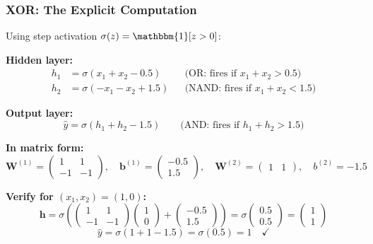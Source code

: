 \documentclass[notes,11pt, aspectratio=169]{beamer}
\newcommand{\vb}{\mathbf{b}}
\newcommand{\vh}{\mathbf{h}}
\newcommand{\vW}{\mathbf{W}}
\begin{document}
\begin{frame}
\frametitle{XOR: The Explicit Computation}

Using step activation $\sigma(z) = \mathbbm{1}[z > 0]$:

\vspace{4pt}
\textbf{Hidden layer:}
\begin{align*}
    h_1 &= \sigma(x_1 + x_2 - 0.5) && \text{(OR: fires if $x_1 + x_2 > 0.5$)} \\
    h_2 &= \sigma(-x_1 - x_2 + 1.5) && \text{(NAND: fires if $x_1 + x_2 < 1.5$)}
\end{align*}

\textbf{Output layer:}
\[
    \hat{y} = \sigma(h_1 + h_2 - 1.5) \qquad \text{(AND: fires if $h_1 + h_2 > 1.5$)}
\]

\vspace{4pt}
\textbf{In matrix form:}
\[
    \vW^{(1)} = \begin{pmatrix} 1 & 1 \\ -1 & -1 \end{pmatrix}, \quad
    \vb^{(1)} = \begin{pmatrix} -0.5 \\ 1.5 \end{pmatrix}, \quad
    \vW^{(2)} = \begin{pmatrix} 1 & 1 \end{pmatrix}, \quad
    b^{(2)} = -1.5
\]

\vspace{4pt}
\textbf{Verify for $(x_1, x_2) = (1, 0)$:}
\[
    \vh = \sigma\!\left(\begin{pmatrix}1 & 1 \\ -1 & -1\end{pmatrix}\begin{pmatrix}1\\0\end{pmatrix} + \begin{pmatrix}-0.5\\1.5\end{pmatrix}\right) = \sigma\!\begin{pmatrix}0.5\\0.5\end{pmatrix} = \begin{pmatrix}1\\1\end{pmatrix}
\]
\[
    \hat{y} = \sigma(1 + 1 - 1.5) = \sigma(0.5) = 1 \quad \checkmark
\]
\end{frame}


\end{document}
